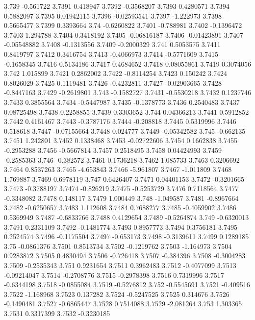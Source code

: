 3.739  -0.561722
3.7391  0.418947
3.7392  -0.3568207
3.7393  0.4280571
3.7394  0.5882097
3.7395  0.01942115
3.7396  -0.02593541
3.7397  -1.222973
3.7398  0.5665477
3.7399  0.3393664
3.74  -0.6260822
3.7401  -0.788981
3.7402  -0.1396472
3.7403  1.294788
3.7404  0.3418192
3.7405  -0.06816187
3.7406  -0.01423891
3.7407  -0.05548882
3.7408  -0.1313556
3.7409  -0.2000329
3.741  0.5053575
3.7411  0.8419797
3.7412  0.3416754
3.7413  -0.4066973
3.7414  -0.5771609
3.7415  -0.1658345
3.7416  0.5134186
3.7417  0.4684652
3.7418  0.08055861
3.7419  0.3074056
3.742  1.015899
3.7421  0.2862002
3.7422  -0.8114254
3.7423  0.150242
3.7424  0.8026029
3.7425  0.1119481
3.7426  -0.4232811
3.7427  -0.02903665
3.7428  -0.8447163
3.7429  -0.2619801
3.743  -0.1582727
3.7431  -0.5530218
3.7432  0.1237746
3.7433  0.3855564
3.7434  -0.5447987
3.7435  -0.1378773
3.7436  0.2540483
3.7437  0.08725498
3.7438  0.2258855
3.7439  0.3303652
3.744  0.04366213
3.7441  0.5912852
3.7442  0.4161467
3.7443  -0.3787176
3.7444  -0.208818
3.7445  0.5319996
3.7446  0.518618
3.7447  -0.07155664
3.7448  0.024777
3.7449  -0.05342582
3.745  -0.662135
3.7451  1.242801
3.7452  0.1338468
3.7453  -0.02722606
3.7454  0.1662838
3.7455  -0.2953288
3.7456  -0.5667814
3.7457  0.2518495
3.7458  0.04424993
3.7459  -0.2585363
3.746  -0.382572
3.7461  0.1736218
3.7462  1.085733
3.7463  0.3206692
3.7464  0.8537263
3.7465  -4.653843
3.7466  -5.961807
3.7467  -1.011809
3.7468  1.769887
3.7469  0.6978119
3.747  0.6426407
3.7471  0.04401153
3.7472  -0.3201665
3.7473  -0.3788197
3.7474  -0.826219
3.7475  -0.5253729
3.7476  0.7118564
3.7477  -0.3348082
3.7478  0.148117
3.7479  1.000449
3.748  -1.049587
3.7481  -0.8967664
3.7482  -0.6250657
3.7483  1.112608
3.7484  0.7688277
3.7485  -0.4059902
3.7486  0.5369949
3.7487  -0.6833766
3.7488  0.4129654
3.7489  -0.5264874
3.749  -0.6320013
3.7491  0.2331109
3.7492  -0.1481774
3.7493  0.8957773
3.7494  0.3756181
3.7495  0.2524574
3.7496  -0.1175504
3.7497  -0.653173
3.7498  -0.3139611
3.7499  0.1289185
3.75  -0.0861376
3.7501  0.8513734
3.7502  -0.1219762
3.7503  -1.164973
3.7504  0.9283872
3.7505  0.4830494
3.7506  -0.726418
3.7507  -0.384396
3.7508  -0.3004283
3.7509  -0.2535343
3.751  0.9231654
3.7511  0.3962483
3.7512  -0.4077099
3.7513  -0.09214047
3.7514  -0.2708776
3.7515  -0.2978398
3.7516  0.7319996
3.7517  -0.6344198
3.7518  -0.0855084
3.7519  -0.5276812
3.752  -0.5545691
3.7521  -0.409516
3.7522  -1.168968
3.7523  0.137282
3.7524  -0.5247525
3.7525  0.314676
3.7526  -0.1490481
3.7527  -0.6865447
3.7528  0.7514088
3.7529  -2.081264
3.753  1.303365
3.7531  0.3317399
3.7532  -0.3230185
